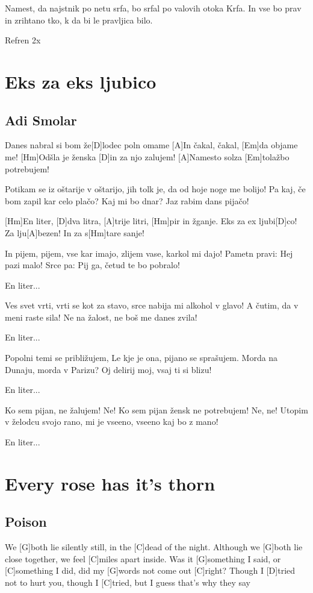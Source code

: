 \documentclass[a4paper,12pt]{article}
\begin{document}
\begin{multicols}{2}
\begin{guitar}
Namest, da najstnik po netu srfa,     
bo srfal po valovih otoka Krfa. 
In vse bo prav in zrihtano tko, 
k da bi le pravljica bilo. 


Refren 2x

\end{guitar}
\section{Eks za eks ljubico}
\subsection*{Adi Smolar}
\begin{guitar}
[Hm]Danes nabral si bom že[D]lodec poln omame
[A]In čakal, čakal, [Em]da objame me!
[Hm]Odšla je ženska [D]in za njo zalujem!
[A]Namesto solza [Em]tolažbo potrebujem!


Potikam se iz oštarije v oštarijo,
jih tolk je, da od hoje noge me bolijo!
Pa kaj, če bom zapil kar celo plačo?
Kaj mi bo dnar? Jaz rabim dans pijačo!


[Hm]En liter, [D]dva litra, [A]trije litri, [Hm]pir in žganje.
Eks za ex ljubi[D]co! Za lju[A]bezen!
In za s[Hm]tare sanje!


In pijem, pijem, vse kar imajo,
zlijem vase, karkol mi dajo!
Pametn pravi: Hej pazi malo!
Srce pa: Pij ga, četud te bo pobralo!


En liter...


Ves svet vrti, vrti se kot za stavo,
srce nabija mi alkohol v glavo!
A čutim, da v meni raste sila!
Ne na žalost, ne boš me danes zvila!


En liter...


Popolni temi se približujem,
Le kje je ona, pijano se sprašujem.
Morda na Dunaju, morda v Parizu?
Oj delirij moj, vsaj ti si blizu!


En liter...


Ko sem pijan, ne žalujem! Ne!
Ko sem pijan žensk ne potrebujem! Ne, ne!
Utopim v želodcu svojo rano, 
mi je vseeno, vseeno kaj bo z mano!


En liter...

\end{guitar}
\section{Every rose has it's thorn}
\subsection*{Poison}
\begin{guitar}
We [G]both lie silently still, 
in the [C]dead of the night.
Although we [G]both lie close together, 
we feel [C]miles apart inside.
Was it [G]something I said, or [C]something I did,
did my [G]words not come out [C]right?
Though I [D]tried not to hurt you, 
though I [C]tried, 
but I guess that's why they say



\end{guitar}
\end{multicols}
\end{document}
